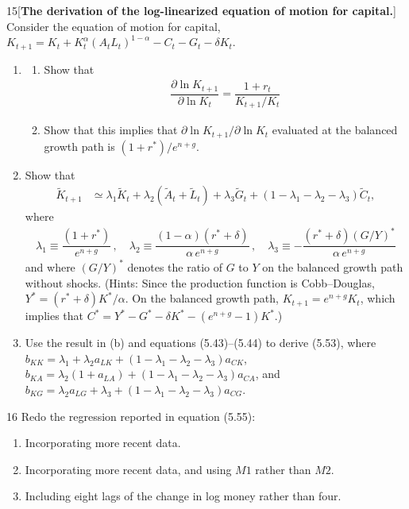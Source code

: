 \begin{problem}{15}[\textbf{The derivation of the log-linearized equation of motion for capital.}]
Consider the equation of motion for capital, \(K_{t+1}=K_t+K_t^\alpha\left(A_tL_t\right)^{1-\alpha}-C_t-G_t-\delta K_t\).
\begin{enumerate}[label=(\alph*)]
    \item
    \begin{enumerate}[label=(\roman*)]
        \item Show that 
        \begin{align*}
            \dfrac{\partial \ln K_{t+1}}{\partial \ln K_t} = \dfrac{1+r_t}{K_{t+1}/K_t}
        \end{align*}
        \item Show that this implies that \(\partial\ln K_{t+1}/\partial\ln K_t\) evaluated at the balanced growth path is \(\left(1+r^*\right)/e^{n+g}\).
    \end{enumerate}
    \item Show that
    \begin{align*}
        \tilde{K}_{t+1}
        &\simeq
        \lambda_1\tilde{K}_t
        +\lambda_2\left(\tilde{A}_t+\tilde{L}_t\right)
        +\lambda_3\tilde{G}_t
        +\left(1-\lambda_1-\lambda_2-\lambda_3\right)\tilde{C}_t,
    \end{align*}
    where
    \begin{align*}
        \lambda_1 \equiv \dfrac{\left(1+r^*\right)}{e^{n+g}}\,,\quad 
        \lambda_2 \equiv \dfrac{\left(1-\alpha\right)\left(r^*+\delta\right)}{\alpha \, e^{n+g}}\,,\quad 
        \lambda_3 \equiv -\dfrac{\left(r^*+\delta\right)\left(G/Y\right)^*}{\alpha \, e^{n+g}}
    \end{align*}
    and where \(\left(G/Y\right)^*\) denotes the ratio of \(G\) to \(Y\) on the balanced growth path without shocks. (Hints: Since the production function is Cobb--Douglas, \(Y^*=\left(r^*+\delta\right)K^*/\alpha\). On the balanced growth path, \(K_{t+1}=e^{n+g}K_t\), which implies that \(C^*=Y^*-G^*-\delta K^*-\left(e^{n+g}-1\right)K^*\).)
    \item Use the result in (b) and equations (5.43)--(5.44) to derive (5.53), where \(b_{KK}=\lambda_1+\lambda_2a_{LK}+\left(1-\lambda_1-\lambda_2-\lambda_3\right)a_{CK}\), \(b_{KA}=\lambda_2\left(1+a_{LA}\right)+\left(1-\lambda_1-\lambda_2-\lambda_3\right)a_{CA}\), and \(b_{KG}=\lambda_2a_{LG}+\lambda_3+\left(1-\lambda_1-\lambda_2-\lambda_3\right)a_{CG}\).
\end{enumerate}
\end{problem}

\begin{problem}{16}
Redo the regression reported in equation (5.55):
\begin{enumerate}[label=(\alph*)]
    \item Incorporating more recent data.
    \item Incorporating more recent data, and using \(M1\) rather than \(M2\).
    \item Including eight lags of the change in log money rather than four.
\end{enumerate}
\end{problem}

